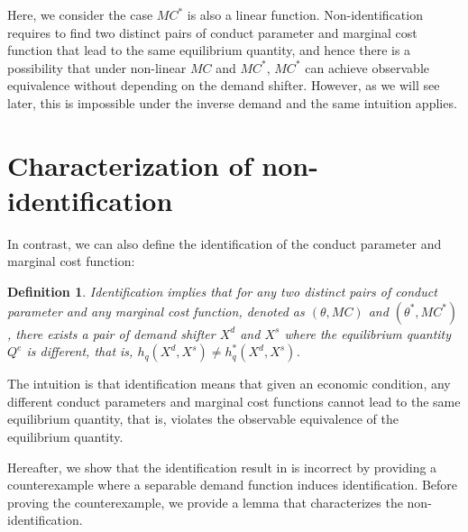 \documentclass[11pt, a4paper]{article}
\newtheorem{definition}{Definition}
\theoremstyle{remark}
\begin{document}
Here, we consider the case $MC^{*}$ is also a linear function.
Non-identification requires to find two distinct pairs of conduct parameter and marginal cost function that lead to the same equilibrium quantity, and hence there is a possibility that under non-linear $MC$ and $MC^{*}$, $MC^{*}$ can achieve observable equivalence without depending on the demand shifter.
However, as we will see later, this is impossible under the inverse demand and the same intuition applies.




\section{Characterization of non-identification}\label{sec:non-identification_characterization}

In contrast, we can also define the identification of the conduct parameter and marginal cost function:
\begin{definition}\label{def:identification}
    Identification implies that for any two distinct pairs of conduct parameter and any marginal cost function, denoted as $(\theta, MC)$ and $(\theta^{*}, MC^{*})$, there exists a pair of demand shifter $X^{d}$ and $X^{s}$ where the equilibrium quantity $Q^e$ is different, that is, $h_q(X^{d}, X^{s}) \ne h_q^{*}(X^{d}, X^{s})$.
\end{definition}
The intuition is that identification means that given an economic condition, any different conduct parameters and marginal cost functions cannot lead to the same equilibrium quantity, that is, violates the observable equivalence of the equilibrium quantity.


Hereafter, we show that the identification result in \citet{lau1982identifying} is incorrect by providing a counterexample where a separable demand function induces identification.
Before proving the counterexample, we provide a lemma that characterizes the non-identification.
\end{document}
